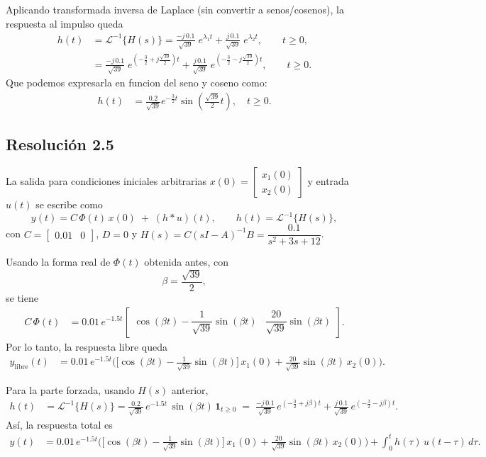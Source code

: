 \documentclass[
  11pt,
  letterpaper,
   addpoints,
   answers
  ]{exam}
\begin{document}
\begin{solution}
Aplicando transformada inversa de Laplace (sin convertir a senos/cosenos), la
respuesta al impulso queda
\begin{align}
h(t)
&=\mathcal{L}^{-1}\{H(s)\}
=\frac{-j\,0.1}{\sqrt{39}}\;e^{\lambda_1 t}
+\frac{j\,0.1}{\sqrt{39}}\;e^{\lambda_2 t},\qquad t\ge 0,\\
&=\frac{-j\,0.1}{\sqrt{39}}\;e^{\left(-\frac{3}{2}+j\frac{\sqrt{39}}{2}\right)t}
+\frac{j\,0.1}{\sqrt{39}}\;e^{\left(-\frac{3}{2}-j\frac{\sqrt{39}}{2}\right)t},\qquad t\ge 0.
\end{align}
Que podemos expresarla en funcion del seno y coseno como: 
\begin{align}
h(t) &= \frac{0.2}{\sqrt{39}} e^{-\frac{3}{2}t} \sin\left(\frac{\sqrt{39}}{2}t\right), \quad t \geq 0.
\end{align}
\subsection*{Resolución 2.5}

La salida para condiciones iniciales arbitrarias $x(0)=\begin{bmatrix}x_1(0)\\ x_2(0)\end{bmatrix}$ y entrada $u(t)$ se escribe como
\begin{equation}
y(t)=C\,\Phi(t)\,x(0)\;+\;(h*u)(t),\qquad h(t)=\mathcal{L}^{-1}\!\{H(s)\},
\end{equation}
con $C=\begin{bmatrix}0.01&0\end{bmatrix}$, $D=0$ y $H(s)=C(sI-A)^{-1}B=\dfrac{0.1}{s^2+3s+12}$.

Usando la forma real de $\Phi(t)$ obtenida antes, con
\[
\beta=\frac{\sqrt{39}}{2},
\]
se tiene
\begin{align}
C\,\Phi(t)
&=0.01\,e^{-1.5t}\!
\begin{bmatrix}
\cos(\beta t)-\dfrac{1}{\sqrt{39}}\sin(\beta t) &
\dfrac{20}{\sqrt{39}}\sin(\beta t)
\end{bmatrix}.
\end{align}
Por lo tanto, la respuesta libre queda
\begin{align}
y_{\text{libre}}(t)
&=0.01\,e^{-1.5t}
\Bigg(
\Big[\cos(\beta t)-\frac{1}{\sqrt{39}}\sin(\beta t)\Big]\,x_1(0)
+\frac{20}{\sqrt{39}}\sin(\beta t)\,x_2(0)
\Bigg).
\end{align}

Para la parte forzada, usando $H(s)$ anterior,
\begin{align}
h(t)
&=\mathcal{L}^{-1}\!\{H(s)\}
=\frac{0.2}{\sqrt{39}}\,e^{-1.5t}\,\sin(\beta t)\,\mathbf{1}_{t\ge 0}
\;=\;\frac{-j\,0.1}{\sqrt{39}}\,e^{(-\frac{3}{2}+j\beta)t}
+\frac{j\,0.1}{\sqrt{39}}\,e^{(-\frac{3}{2}-j\beta)t}.
\end{align}
Así, la respuesta total es
\begin{align}
y(t)
&=0.01\,e^{-1.5t}
\Bigg(
\Big[\cos(\beta t)-\frac{1}{\sqrt{39}}\sin(\beta t)\Big]\,x_1(0)
+\frac{20}{\sqrt{39}}\sin(\beta t)\,x_2(0)
\Bigg)
+\int_{0}^{t} h(\tau)\,u(t-\tau)\,d\tau .
\end{align}


\end{solution}
\end{document}
